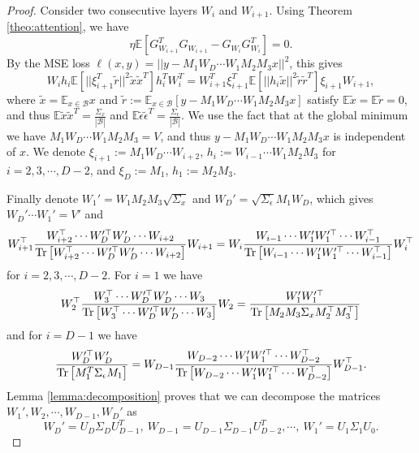\documentclass{article}
\theoremstyle{plain}
\newcommand{\E}{\mathbb{E}}
\newcommand{\Tr}{{\rm Tr}}
\begin{document}
\begin{proof}
Consider two consecutive layers $W_i$ and $W_{i+1}$. Using Theorem \ref{theo:attention}, we have
\begin{equation}
\eta\E[G_{W_{i+1}}^T G_{W_{i+1}}-G_{W_i} G_{W_i}^T]=0.
\end{equation}
By the MSE loss $\ell(x,y)=||y-M_1W_D\cdots W_1M_2M_3x||^2$, this gives
\begin{equation}
W_ih_i\mathbb{E}[||\xi_{i+1}^T\tilde{r}||^2\tilde{x}\tilde{x}^T]h_i^TW_i^T=W_{i+1}^T\xi_{i+1}^T\mathbb{E}[||h_i\tilde{x}||^2\tilde{r}\tilde{r}^T]\xi_{i+1}W_{i+1},
\end{equation}
where $\tilde{x}=\E_{x\in\mathcal{B}}x$ and $\tilde{r}:=\E_{x\in\mathcal{B}}[y-M_1W_D\cdots W_1M_2M_3x]$ satisfy $\E\tilde{x}=\E\tilde{r}=0$, and thus $\E\tilde{x}\tilde{x}^T=\frac{\Sigma_x}{|\mathcal{B}|}$ and $\E\tilde{\epsilon}\tilde{\epsilon}^T=\frac{\Sigma_\epsilon}{|\mathcal{B}|}$. We use the fact that at the global minimum we have $M_1W_D\cdots W_1M_2M_3=V$, and thus $y-M_1W_D\cdots W_1M_2M_3x$ is independent of $x$. We denote $\xi_{i+1}:=M_1W_D\cdots W_{i+2}$, $h_i:=W_{i-1}\cdots W_1M_2M_3$ for $i=2,3,\cdots,D-2$, and $\xi_D:=M_1$, $h_1:=M_2M_3$.

Finally denote $W_1'=W_1M_2M_3\sqrt{\Sigma_x}$ and $W_D'=\sqrt{\Sigma_\epsilon}M_1W_D$, which gives $W_D'\cdots W_1'=V'$ and 
\begin{equation}
W_{i+1}^{\top} \frac{W_{i+2}^{\top} \cdots W_D^{\prime \top} W_D^{\prime} \cdots W_{i+2}}{\Tr \left[W_{i+2}^{\top} \cdots W_D^{\prime \top} W_D^{\prime} \cdots W_{i+2}\right]} W_{i+1}=W_i \frac{W_{i-1} \cdots W_1^{\prime} W_1^{\prime \top} \cdots W_{i-1}^{\top}}{\Tr \left[W_{i-1} \cdots W_1^{\prime} W_1^{\prime \top} \cdots W_{i-1}^{\top}\right]} W_i^{\top}
\label{eq:eqi}
\end{equation}
for $i=2,3,\cdots,D-2$. For $i=1$ we have
\begin{equation}
W_{2}^{\top} \frac{W_{3}^{\top} \cdots W_D^{\prime \top} W_D^{\prime} \cdots W_{3}}{\Tr \left[W_{3}^{\top} \cdots W_D^{\prime \top} W_D^{\prime} \cdots W_{3}\right]} W_{2}= \frac{W_1^{\prime} W_1^{\prime \top} }{\Tr \left[M_2M_3\Sigma_x M_2^\top M_3^\top\right]} 
\label{eq:eq1}
\end{equation}
and for $i=D-1$ we have
\begin{equation}
\frac{W_D^{\prime \top} W_D^{\prime}}{\Tr \left[M_1^T\Sigma_\epsilon M_1\right]}=W_{D-1} \frac{W_{D-2} \cdots W_1^{\prime} W_1^{\prime \top} \cdots W_{D-2}^{\top}}{\Tr \left[W_{D-2} \cdots W_1^{\prime} W_1^{\prime \top} \cdots W_{D-2}^{\top}\right]} W_{D-1}^{\top}.
\label{eq:eqD}
\end{equation}
Lemma \ref{lemma:decomposition} proves that we can decompose the matrices $W_1',W_2,\cdots,W_{D-1},W_D'$ as
\begin{equation}
W_D'=U_D\Sigma_DU_{D-1}^T,\ W_{D-1}=U_{D-1}\Sigma_{D-1}U_{D-2}^T,\cdots,\ W_1'=U_1\Sigma_1U_0.
\end{equation}


\end{proof}
\end{document}
